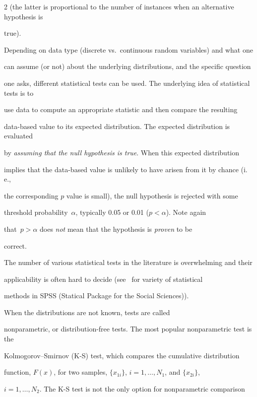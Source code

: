 \begin{multicols}{2}
(the latter is proportional to the number of instances when an alternative hypothesis is


true).





  Depending on data type (discrete vs.\ continuous random variables) and what one


can assume (or not) about the underlying distributions, and the specific question


one asks, different statistical tests can be used. The underlying idea of statistical tests is to


use data to compute an appropriate statistic and then compare the resulting


  data-based value to its expected distribution. The expected distribution is evaluated


by \textit{assuming that the null hypothesis is true}. When this expected distribution


implies that the data-based value is unlikely to have arisen from it by chance (i.\,e.,


the corresponding $p$ value is small), the null hypothesis is rejected with some


threshold probability~$\alpha$, typically 0.05 or 0.01 ($p<\alpha$). Note again


that~$p>\alpha$ does \textit{not} mean that the hypothesis is \textit{proven} to be


correct.





  The number of various statistical tests in the literature is overwhelming and their


applicability is often hard to decide (see~\cite{29-kl, 30-kl} for variety of statistical


methods in SPSS (Statical Package for the Social Sciences)).


When the distributions are not known, tests are called


nonparametric, or distribution-free tests. The most popular nonparametric test is the


Kolmogorov--Smirnov (K-S) test, which compares the cumulative distribution


function, $F (x)$, for two samples, $\{x_{1i}\}$, $i = 1,\ldots  , N_1$, and $\{x_{2i}\}$,


$i = 1,\ldots  , N_2$. The K-S test is not the only option for nonparametric comparison



\end{multicols}

